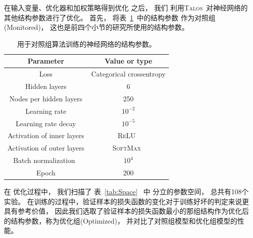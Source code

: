 在输入变量、优化器和加权策略得到优化
之后，
我们
利用\textsc{Talos}~\cite{TALOS}对神经网络的其他结构参数进行了优化。
首先，
将表~\ref{tab:Hyper}~中的结构参数
作为对照组(Monitored)，
这也是前四个小节的研究所使用的结构参数。

\begin{table}[ht]
\caption{用于对照组算法训练的神经网络的结构参数。}
\begin{center}
\begin{tabular}{c|c}
    \hline
    \hline
    Parameter & Value or type  \\
    \hline  
    Loss & Categorical crossentropy \\
    \hline  
    Hidden layers & 6 \\
    \hline  
    Nodes per hidden layers & 250 \\
    \hline  
    Learning rate & $10^{-2}$\\
    \hline  
    Learning rate decay & $10^{-5}$ \\
    \hline  
    Activation of inner layers & \textsc{ReLU}~\cite{Glorot:2011} \\
    \hline  
    Activation of outer layers & \textsc{SoftMax}~\cite{MLMIT} \\
    \hline  
    Batch normalization~\cite{Ioffe:2015} & $10^{4}$ \\
    \hline  
    Epoch & 200 \\
    \hline
    \hline
\end{tabular}
\end{center}
\label{tab:Hyper}
\end{table}

在
优化过程中，
我们扫描了
表~\ref{tab:Space}~
中
分立的参数空间，
总共有108个实验。
在训练的过程中，验证样本的损失函数的变化对于训练好坏的判定来说更具有参考价值，
因此我们选取了验证样本的损失函数最小的那组结构作为优化后的结构参数，称为优化组(Optimized)，
并对比了对照组模型和优化组模型的性能。

